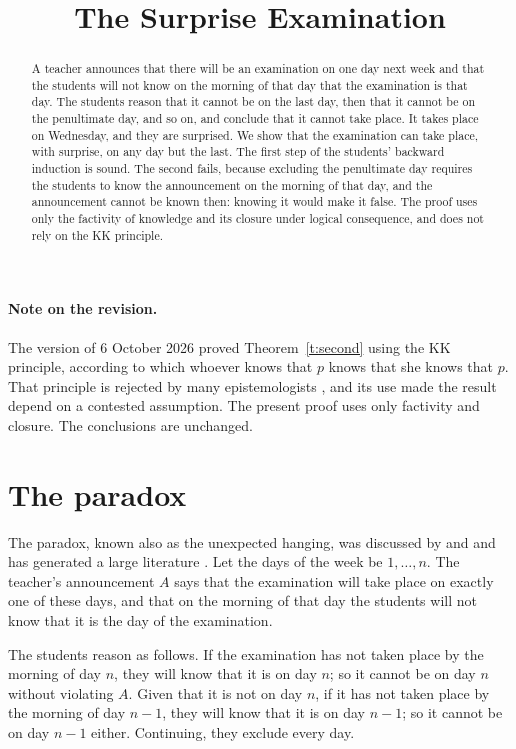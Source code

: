 \documentclass{situationist-preprint}
\title{The Surprise Examination}
\begin{document}
\maketitle

\begin{abstract}
A teacher announces that there will be an examination on one day next week and that the students will not know on the morning of that day that the examination is that day. The students reason that it cannot be on the last day, then that it cannot be on the penultimate day, and so on, and conclude that it cannot take place. It takes place on Wednesday, and they are surprised. We show that the examination can take place, with surprise, on any day but the last. The first step of the students' backward induction is sound. The second fails, because excluding the penultimate day requires the students to know the announcement on the morning of that day, and the announcement cannot be known then: knowing it would make it false. The proof uses only the factivity of knowledge and its closure under logical consequence, and does not rely on the KK principle.
\end{abstract}

\paragraph{Note on the revision.} The version of 6 October 2026 proved Theorem~\ref{t:second} using the KK principle, according to which whoever knows that $p$ knows that she knows that $p$. That principle is rejected by many epistemologists \citep{Williamson2000}, and its use made the result depend on a contested assumption. The present proof uses only factivity and closure. The conclusions are unchanged.

\section{The paradox}

The paradox, known also as the unexpected hanging, was discussed by \citet{OConnor1948} and \citet{Quine1953} and has generated a large literature \citep{Sorensen1988,Chow1998}. Let the days of the week be $1, \dots, n$. The teacher's announcement $A$ says that the examination will take place on exactly one of these days, and that on the morning of that day the students will not know that it is the day of the examination.

The students reason as follows. If the examination has not taken place by the morning of day $n$, they will know that it is on day $n$; so it cannot be on day $n$ without violating $A$. Given that it is not on day $n$, if it has not taken place by the morning of day $n-1$, they will know that it is on day $n-1$; so it cannot be on day $n-1$ either. Continuing, they exclude every day.
\end{document}
